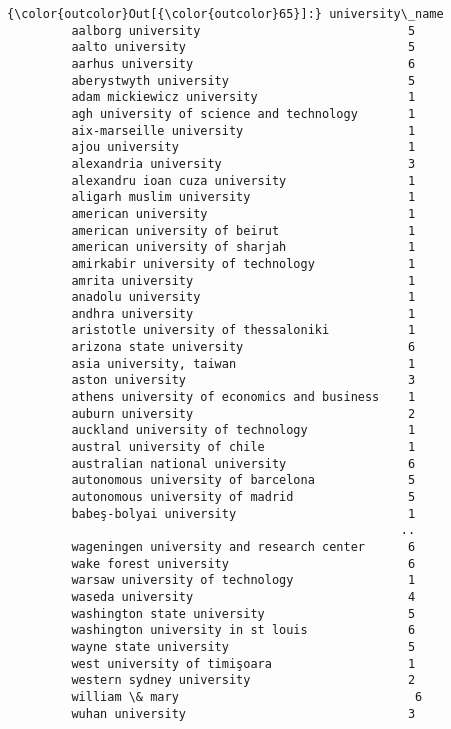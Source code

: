 \documentclass[11pt]{article}
\begin{document}
\begin{Verbatim}[commandchars=\\\{\}]
{\color{outcolor}Out[{\color{outcolor}65}]:} university\_name
         aalborg university                             5
         aalto university                               5
         aarhus university                              6
         aberystwyth university                         5
         adam mickiewicz university                     1
         agh university of science and technology       1
         aix-marseille university                       1
         ajou university                                1
         alexandria university                          3
         alexandru ioan cuza university                 1
         aligarh muslim university                      1
         american university                            1
         american university of beirut                  1
         american university of sharjah                 1
         amirkabir university of technology             1
         amrita university                              1
         anadolu university                             1
         andhra university                              1
         aristotle university of thessaloniki           1
         arizona state university                       6
         asia university, taiwan                        1
         aston university                               3
         athens university of economics and business    1
         auburn university                              2
         auckland university of technology              1
         austral university of chile                    1
         australian national university                 6
         autonomous university of barcelona             5
         autonomous university of madrid                5
         babeş-bolyai university                        1
                                                       ..
         wageningen university and research center      6
         wake forest university                         6
         warsaw university of technology                1
         waseda university                              4
         washington state university                    5
         washington university in st louis              6
         wayne state university                         5
         west university of timişoara                   1
         western sydney university                      2
         william \& mary                                 6
         wuhan university                               3

\end{Verbatim}
\end{document}
